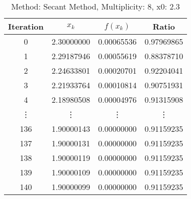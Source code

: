 \begin{table}
\centering
\caption{Method: Secant Method, Multiplicity: 8, x0: 2.3}
\label{tab:table_Secant_Method_8_2_3}
\begin{tabular}{c c c c}
\toprule
Iteration &      $x_k$ &   $f(x_k)$ &      Ratio \\
\midrule
        0 & 2.30000000 & 0.00065536 & 0.97969865 \\
        1 & 2.29187946 & 0.00055619 & 0.88378710 \\
        2 & 2.24633801 & 0.00020701 & 0.92204041 \\
        3 & 2.21933764 & 0.00010814 & 0.90751931 \\
        4 & 2.18980508 & 0.00004976 & 0.91315908 \\
   \vdots &     \vdots &     \vdots &     \vdots \\
      136 & 1.90000143 & 0.00000000 & 0.91159235 \\
      137 & 1.90000131 & 0.00000000 & 0.91159235 \\
      138 & 1.90000119 & 0.00000000 & 0.91159235 \\
      139 & 1.90000109 & 0.00000000 & 0.91159235 \\
      140 & 1.90000099 & 0.00000000 & 0.91159235 \\
\bottomrule
\end{tabular}
\end{table}
